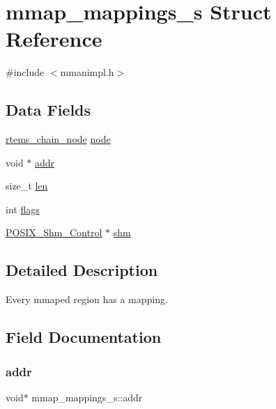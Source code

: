\hypertarget{structmmap__mappings__s}{}\section{mmap\+\_\+mappings\+\_\+s Struct Reference}
\label{structmmap__mappings__s}


{\ttfamily \#include $<$mmanimpl.\+h$>$}

\subsection*{Data Fields}
\begin{DoxyCompactItemize}
\item 
\mbox{\hyperlink{structChain__Node__struct}{rtems\+\_\+chain\+\_\+node}} \mbox{\hyperlink{structmmap__mappings__s_a94954468f896c782bbb37d9dfebbc08b}{node}}
\item 
void $\ast$ \mbox{\hyperlink{structmmap__mappings__s_a3d2be5b69108952c56758c65a857eb41}{addr}}
\item 
size\+\_\+t \mbox{\hyperlink{structmmap__mappings__s_a40212b333812a712df0ed2f9d69e069f}{len}}
\item 
int \mbox{\hyperlink{structmmap__mappings__s_a95c4a8ce4546f0e092af8b29add270d8}{flags}}
\item 
\mbox{\hyperlink{structPOSIX__Shm__Control}{P\+O\+S\+I\+X\+\_\+\+Shm\+\_\+\+Control}} $\ast$ \mbox{\hyperlink{structmmap__mappings__s_a625df943b7873351709b8cee15a9c6bd}{shm}}
\end{DoxyCompactItemize}


\subsection{Detailed Description}
Every mmap\textquotesingle{}ed region has a mapping. 

\subsection{Field Documentation}
\mbox{\label{structmmap__mappings__s_a3d2be5b69108952c56758c65a857eb41}} 
\subsubsection{\texorpdfstring{addr}{addr}}
{\footnotesize\ttfamily void$\ast$ mmap\+\_\+mappings\+\_\+s\+::addr}

